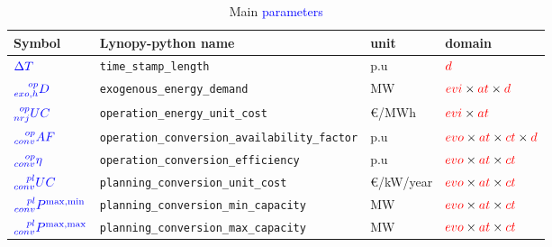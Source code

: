 \documentclass{article}
\begin{document}
\begin{table}[h]
\footnotesize
\centering
\caption{Main \textcolor{blue}{parameters}}
\begin{tabular}{llll}
\hline
    \textbf{Symbol} & \textbf{Lynopy-python name} & \textbf{unit}  & \textbf{domain} \\ \hline
    $\textcolor{blue}{\Delta T }$&  \verb|time_stamp_length| & p.u & $\textcolor{red}{d}$ \\ 
    
    $\textcolor{blue}{\prescript{op}{exo,h}{D}}$&  \verb|exogenous_energy_demand| & MW & $\textcolor{red}{evi}  \times \textcolor{red}{at} \times \textcolor{red}{d}$ \\ 
       
    $\textcolor{blue}{\prescript{op}{nrj}{UC}}$&  \verb|operation_energy_unit_cost| & \euro/MWh & $\textcolor{red}{evi}  \times \textcolor{red}{at}$  \\ 
    
     $\textcolor{blue}{\prescript{op}{conv}{AF}}$&\verb|operation_conversion_availability_factor| &  p.u & $\textcolor{red}{evo}  \times \textcolor{red}{at}  \times \textcolor{red}{ct} \times \textcolor{red}{d}$ \\
     
    $\textcolor{blue}{\prescript{op}{conv}{\eta}}$&  \verb|operation_conversion_efficiency| & p.u & $\textcolor{red}{evo}  \times \textcolor{red}{at}  \times \textcolor{red}{ct}$ \\ \hline
    
    $\textcolor{blue}{\prescript{pl}{conv}{UC}}$ &  \verb|planning_conversion_unit_cost| & \euro /kW/year  & $\textcolor{red}{evo}  \times \textcolor{red}{at}  \times \textcolor{red}{ct}$  \\
  
    $\textcolor{blue}{ \prescript{pl}{conv}{P}^{\max,\min}}$ &  \verb|planning_conversion_min_capacity| & MW & $\textcolor{red}{evo}  \times \textcolor{red}{at}  \times \textcolor{red}{ct}$   \\ 
    
    $\textcolor{blue}{ \prescript{pl}{conv}{P}^{\max,\max }}$ &  \verb|planning_conversion_max_capacity| & MW & $\textcolor{red}{evo}  \times \textcolor{red}{at}  \times \textcolor{red}{ct}$  \\ \hline
  \end{tabular}
\end{table}
\end{document}
